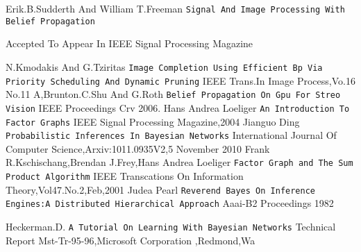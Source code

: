 \documentclass{raitdisser}
\begin{document}
\begin{thebibliography}{9}
Erik.B.Sudderth And William T.Freeman
\texttt{Signal And Image Processing With Belief Propagation}

Accepted To Appear In IEEE Signal Processing Magazine

N.Kmodakis And G.Tziritas
\texttt{Image Completion Using Efficient Bp Via Priority Scheduling And Dynamic Pruning}
IEEE Trans.In Image Process,Vo.16 No.11
A,Brunton.C.Shu And G.Roth
\texttt{Belief Propagation On Gpu For Streo Vision}
IEEE Proceedings Crv 2006.
Hans Andrea Loeliger
\texttt{An Introduction To Factor Graphs}
IEEE Signal Processing Magazine,2004
Jianguo Ding
\texttt{Probabilistic Inferences In Bayesian Networks}
International Journal Of Computer Science,Arxiv:1011.0935V2,5 November 2010
Frank R.Kschischang,Brendan J.Frey,Hans Andrea Loeliger
\texttt{Factor Graph and The Sum Product Algorithm}
IEEE Transcations On Information Theory,Vol47.No.2,Feb,2001
Judea Pearl
\texttt{Reverend Bayes On Inference Engines:A Distributed Hierarchical Approach}
Aaai-B2 Proceedings 1982

Heckerman.D.
\texttt{A Tutorial On Learning With Bayesian Networks}
Technical Report Mst-Tr-95-96,Microsoft Corporation ,Redmond,Wa

\end{thebibliography}
%
\end{document}
